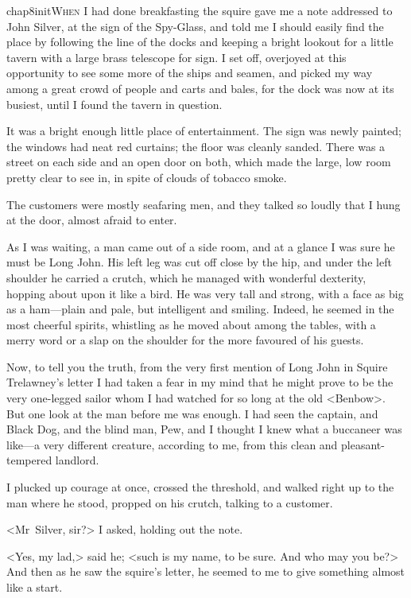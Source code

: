 
\lettrine{chap8initW}{hen} I had done breakfasting the squire gave me a note addressed to John Silver, at the sign of the Spy-Glass, and told me I should easily find the place by following the line of the docks and keeping a bright lookout for a little tavern with a large brass telescope for sign. I set off, overjoyed at this opportunity to see some more of the ships and seamen, and picked my way among a great crowd of people and carts and bales, for the dock was now at its busiest, until I found the tavern in question.

It was a bright enough little place of entertainment. The sign was newly painted; the windows had neat red curtains; the floor was cleanly sanded. There was a street on each side and an open door on both, which made the large, low room pretty clear to see in, in spite of clouds of tobacco smoke.

The customers were mostly seafaring men, and they talked so loudly that I hung at the door, almost afraid to enter.

As I was waiting, a man came out of a side room, and at a glance I was sure he must be Long John. His left leg was cut off close by the hip, and under the left shoulder he carried a crutch, which he managed with wonderful dexterity, hopping about upon it like a bird. He was very tall and strong, with a face as big as a ham—plain and pale, but intelligent and smiling. Indeed, he seemed in the most cheerful spirits, whistling as he moved about among the tables, with a merry word or a slap on the shoulder for the more favoured of his guests.

Now, to tell you the truth, from the very first mention of Long John in Squire Trelawney's letter I had taken a fear in my mind that he might prove to be the very one-legged sailor whom I had watched for so long at the old <Benbow>. But one look at the man before me was enough. I had seen the captain, and Black Dog, and the blind man, Pew, and I thought I knew what a buccaneer was like—a very different creature, according to me, from this clean and pleasant-tempered landlord.

I plucked up courage at once, crossed the threshold, and walked right up to the man where he stood, propped on his crutch, talking to a customer.

<Mr~Silver, sir?> I asked, holding out the note.

<Yes, my lad,> said he; <such is my name, to be sure. And who may you be?> And then as he saw the squire's letter, he seemed to me to give something almost like a start.

